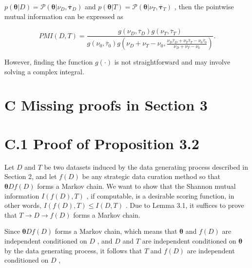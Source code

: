 \(p ( \pmb \theta | D ) = \mathcal { P } ( \pmb \theta | \nu _ { D } , \overline { { \pmb \tau } } _ { D } )\)
and
\(p ( \pmb \theta | T ) = \mathcal { P } ( \pmb \theta | \nu _ { T } , \overline { { \pmb \tau } } _ { T } )\)
, then the pointwise mutual information can be expressed as

\[
P M I ( D , T ) = \frac { g ( \nu _ { D } , \overline { { \tau } } _ { D } ) g ( \nu _ { T } , \overline { { \tau } } _ { T } ) } { g ( \nu _ { 0 } , \overline { { \tau } } _ { 0 } ) g ( \nu _ { D } + \nu _ { T } - \nu _ { 0 } , \frac { \nu _ { D } \overline { { \tau } } _ { D } + \nu _ { T } \overline { { \tau } } _ { T } - \nu _ { 0 } \overline { { \tau } } _ { 0 } } { \nu _ { D } + \nu _ { T } - \nu _ { 0 } } ) } .
\]

However, finding the function \(g ( \cdot )\) is not straightforward and
may involve solving a complex integral.

\section{C Missing proofs in Section
3}\label{c-missing-proofs-in-section-3}

\section{C.1 Proof of Proposition
3.2}\label{c.1-proof-of-proposition-3.2}

Let \(D\) and \(T\) be two datasets induced by the data generating
process described in Section 2, and let \(f ( D )\) be any strategic
data curation method so that \(\pmb \theta  D  f ( D )\) forms a Markov
chain. We want to show that the Shannon mutual information
\(I ( f ( D ) , T )\) , if computable, is a desirable scoring function,
in other words, \(I ( f ( D ) , T ) \leq I ( D , T )\) . Due to Lemma
3.1, it suffices to prove that \(T \to D \to f ( D )\) forms a Markov
chain.

Since \(\pmb \theta  D  f ( D )\) forms a Markov chain, which means that
\(\pmb \theta\) and \(f ( D )\) are independent conditioned on \(D\) ,
and \(D\) and \(T\) are independent conditioned on \(\pmb \theta\) by
the data generating process, it follows that \(T\) and \(f ( D )\) are
independent conditioned on \(D\) ,

